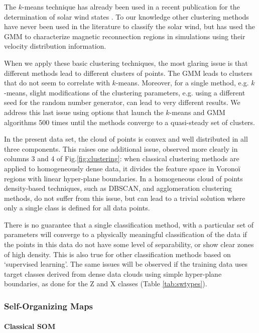 The $k$-means technique has already been used in a recent publication for the determination of solar wind states \citep{Roberts2020}. To our knowledge other clustering methods have never been used in the literature to classify the solar wind, but \citep{Dupuis2020} has used the GMM to characterize magnetic reconnection regions in simulations using their velocity distribution information.

When we apply these basic clustering techniques, the most glaring issue is that different methods lead to different clusters of points. The GMM leads to clusters that do not seem to correlate with $k$-means. Moreover, for a single method, e.g. $k$-means, slight modifications of the clustering parameters, e.g. using a different seed for the random number generator, can lead to very different results. We address this last issue using options that launch the $k$-means and GMM algorithms 500 times until the methods converge to a quasi-steady set of clusters.

In the present data set, the cloud of points is convex and well distributed in all three components. This raises one additional issue, observed more clearly in columns 3 and 4 of Fig.\ref{fig:clustering}: when classical clustering methods are applied to homogeneously dense data, it divides the feature space in Vorono\"i regions with linear hyper-plane boundaries. In a homogeneous cloud of points density-based techniques, such as DBSCAN\citep{ester1996density}, and agglomeration clustering methods, do not suffer from this issue, but can lead to a trivial solution where only a single class is defined for all data points.

There is no guarantee that a single classification method, with a particular set of parameters will converge to a physically meaningful classification of the data if the points in this data do not have some level of separability, or show clear zones of high density. This is also true for other classification methods based on `supervised learning'. The same issues will be observed if the training data uses target classes derived from dense data clouds using simple hyper-plane boundaries, as done for the Z and X classes (Table \ref{tab:swtypes}).

\subsubsection{Self-Organizing Maps}

\paragraph{Classical SOM}

